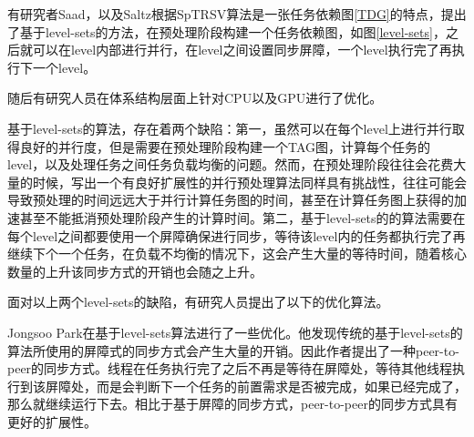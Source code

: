 \begin{figure}[htbp]
    \centering
    \centering
\end{figure}

有研究者Saad\cite{anderson1989solving}，以及Saltz\cite{saltz1990aggregation}根据SpTRSV算法是一张任务依赖图\ref{TDG}的特点，提出了基于level-sets的方法，在预处理阶段构建一个任务依赖图，如图\ref{level-sets}，之后就可以在level内部进行并行，在level之间设置同步屏障，一个level执行完了再执行下一个level。

随后有研究人员在体系结构层面上针对CPU\cite{kabir2015sts}\cite{park2014sparsifying}\cite{Schreiber1982}\cite{wolf2010factors}以及GPU\cite{li2013gpu}\cite{naumov2011parallel}\cite{suchoski2012adapting}进行了优化。

基于level-sets的算法，存在着两个缺陷：第一，虽然可以在每个level上进行并行取得良好的并行度，但是需要在预处理阶段构建一个TAG图，计算每个任务的level，以及处理任务之间任务负载均衡的问题。然而，在预处理阶段往往会花费大量的时候，写出一个有良好扩展性的并行预处理算法同样具有挑战性，往往可能会导致预处理的时间远远大于并行计算任务图的时间，甚至在计算任务图上获得的加速甚至不能抵消预处理阶段产生的计算时间。第二，基于level-sets的的算法需要在每个level之间都要使用一个屏障确保进行同步，等待该level内的任务都执行完了再继续下个一个任务，在负载不均衡的情况下，这会产生大量的等待时间，随着核心数量的上升该同步方式的开销也会随之上升。

面对以上两个level-sets的缺陷，有研究人员提出了以下的优化算法。

Jongsoo Park\cite{park2014sparsifying}在基于level-sets算法进行了一些优化。他发现传统的基于level-sets的算法所使用的屏障式的同步方式会产生大量的开销。因此作者提出了一种peer-to-peer的同步方式。线程在任务执行完了之后不再是等待在屏障处，等待其他线程执行到该屏障处，而是会判断下一个任务的前置需求是否被完成，如果已经完成了，那么就继续运行下去。相比于基于屏障的同步方式，peer-to-peer的同步方式具有更好的扩展性。

